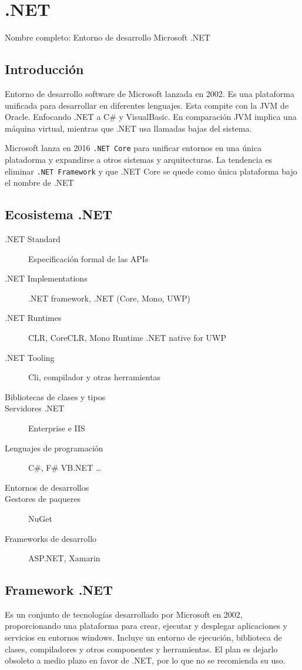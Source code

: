 \setcounter{section}{65}
\section{.NET}

Nombre completo: Entorno de desarrollo Microsoft .NET

\localtableofcontents

\subsection{Introducción}
    Entorno de desarrollo software de Microsoft lanzada en 2002. Es una plataforma unificada para desarrollar en diferentes lenguajes. Esta compite con la JVM de Oracle. Enfocando .NET a C\# y VisualBasic. En comparación JVM implica una máquina virtual, mientras que .NET usa llamadas bajas del sistema.

    Microsoft lanza en 2016 \texttt{.NET Core} para unificar entornos en una única platadorma y expandirse a otros sistemas y arquitecturas. La tendencia es eliminar \texttt{.NET Framework} y que .NET Core se quede como única plataforma bajo el nombre de .NET

\subsection{Ecosistema .NET}
\begin{description}
    \item[.NET Standard] Especificación formal de las APIs
    \item[.NET Implementations] .NET framework, .NET (Core, Mono, UWP)
    \item[.NET Runtimes] CLR, CoreCLR, Mono Runtime .NET native for UWP
    \item[.NET Tooling] Cli, compilador y otras herramientas
    \item[Bibliotecas de clases y tipos] 
    \item[Servidores .NET] Enterprise e IIS
    \item[Lenguajes de programación] C\#, F\# VB.NET \dots
    \item[Entornos de desarrollos]
    \item[Gestores de paqueres] NuGet
    \item[Frameworks de desarrollo] ASP.NET, Xamarin
\end{description}

\subsection{Framework .NET}
    Es un conjunto de tecnologías desarrollado por Microsoft en 2002, proporcionando una plataforma para crear, ejecutar y desplegar aplicaciones y servicios en entornos windows. Incluye un entorno de ejecución, biblioteca de clases, compiladores y otros componentes y herramientas. El plan es dejarlo obsoleto a medio plazo en favor de .NET, por lo que no se recomienda su uso.

